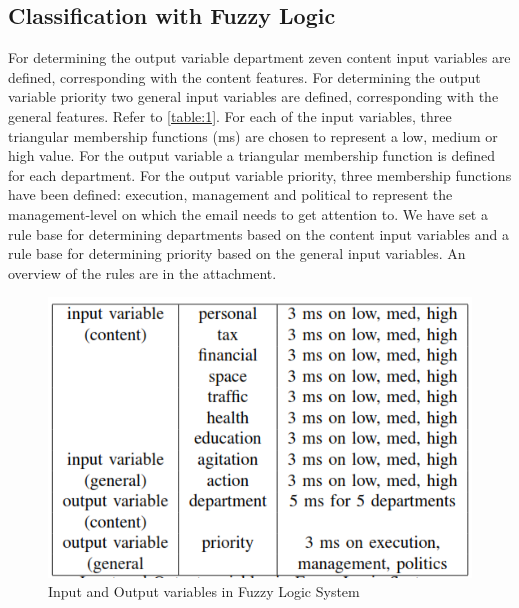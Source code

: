 \documentclass[journal]{IEEEtran}
\begin{document}
\subsection{Classification with Fuzzy Logic}

For determining the output variable department zeven content input variables are defined, corresponding with the content features. For determining the output variable priority two general input variables are defined, corresponding with the general features. Refer to \autoref{table:1}. For each of the input variables, 
three triangular membership functions (ms) are chosen to represent a low, medium or high value. For the output variable a triangular membership function is defined for each department. For the output variable priority, three membership functions have been defined: execution, management and political to represent the management-level on which the email needs to get attention to.  We have set a rule base for determining departments based on the content input variables and a rule base for determining priority based on the general input variables. An overview of the rules are in the attachment. \\

\begin{figure}
	\includegraphics[scale=0.5]{res/inputs_outputs_FLS.png}
	\caption{Input and Output variables in Fuzzy Logic System}
	\label{table:1}
\end{figure}
\end{document}

